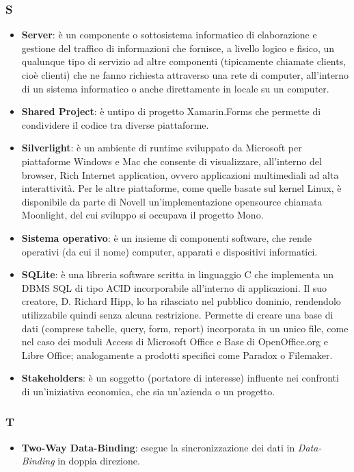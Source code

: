 \subsubsection{S}
\begin{itemize}
	\item \textbf{Server}: è un componente o sottosistema informatico di elaborazione e gestione del traffico di informazioni che fornisce, a livello logico e fisico, un qualunque tipo di servizio ad altre componenti (tipicamente chiamate clients, cioè clienti) che ne fanno richiesta attraverso una rete di computer, all'interno di un sistema informatico o anche direttamente in locale su un computer.
	\item \textbf{Shared Project}: è untipo di progetto Xamarin.Forms che permette di condividere il codice tra diverse piattaforme.
	\item \textbf{Silverlight}:  è un ambiente di runtime sviluppato da Microsoft per piattaforme Windows e Mac che consente di visualizzare, all'interno del browser, Rich Internet application, ovvero applicazioni multimediali ad alta interattività. Per le altre piattaforme, come quelle basate sul kernel Linux, è disponibile da parte di Novell un'implementazione opensource chiamata Moonlight, del cui sviluppo si occupava il progetto Mono.
	\item \textbf{Sistema operativo}: è un insieme di componenti software, che rende operativi (da cui il nome) computer, apparati e dispositivi informatici.
	\item \textbf{SQLite}:  è una libreria software scritta in linguaggio C che implementa un DBMS SQL di tipo ACID incorporabile all'interno di applicazioni. Il suo creatore, D. Richard Hipp, lo ha rilasciato nel pubblico dominio, rendendolo utilizzabile quindi senza alcuna restrizione. Permette di creare una base di dati (comprese tabelle, query, form, report) incorporata in un unico file, come nel caso dei moduli Access di Microsoft Office e Base di OpenOffice.org e Libre Office; analogamente a prodotti specifici come Paradox o Filemaker.
	\item \textbf{Stakeholders}: è un soggetto (portatore di interesse) influente nei confronti di un'iniziativa economica, che sia un'azienda o un progetto.
	
\end{itemize}

\subsubsection{T}
\begin{itemize}
	\item \textbf{Two-Way Data-Binding}: esegue la sincronizzazione dei dati in \textit{Data-Binding} in doppia direzione.
\end{itemize}

